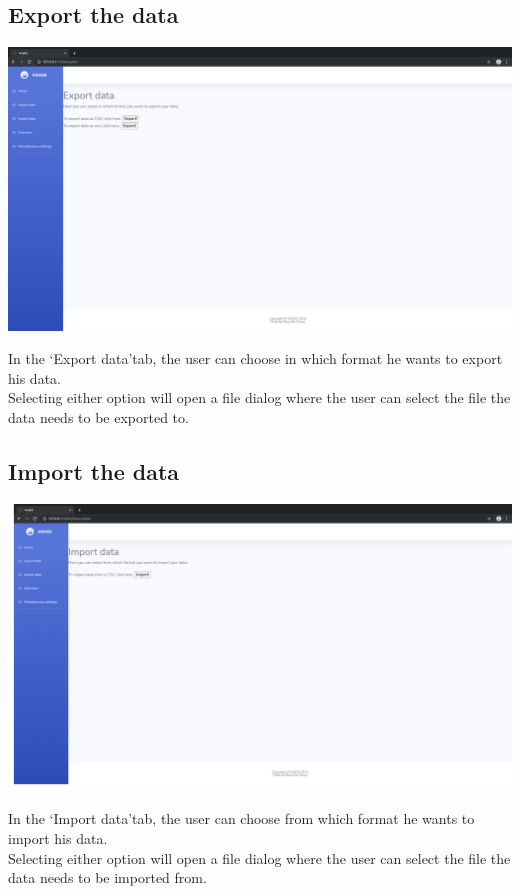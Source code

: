 \documentclass[12pt]{article}
\begin{document}
\subsection{Export the data}
\begin{center}
	\includegraphics[width=\linewidth]{images/Export_data.png}
\end{center}
In the \lq Export data\rq tab, the user can choose in which format he wants to export his data.\\
Selecting either option will open a file dialog where the user can select the file the data needs to be exported to.

\subsection{Import the data}
\begin{center}
	\includegraphics[width=\linewidth]{images/Import_data.png}
\end{center}
In the \lq Import data\rq tab, the user can choose from which format he wants to import his data.\\
Selecting either option will open a file dialog where the user can select the file the data needs to be imported from.
\end{document}
